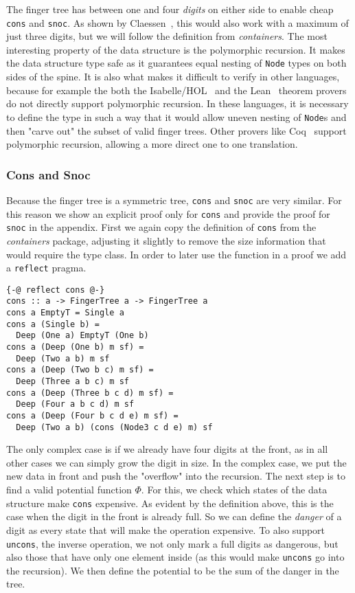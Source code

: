 \documentclass[sigplan,screen]{acmart}
\begin{document}
The finger tree has between one and four \textit{digits} on either side to enable cheap \texttt{cons} and \texttt{snoc}. As shown by Claessen~\cite{fingertrees_new}, this would also work with a maximum of just three digits, but we will follow the definition from \textit{containers}. The most interesting property of the data structure is the polymorphic recursion. It makes the data structure type safe as it guarantees equal nesting of \texttt{Node} types on both sides of the spine. It is also what makes it difficult to verify in other languages, because for example the both the Isabelle/HOL~\cite{isabelle} and the Lean~\cite{lean} theorem provers do not directly support polymorphic recursion. In these languages, it is necessary to define the type in such a way that it would allow uneven nesting of \texttt{Node}s and then "carve out" the subset of valid finger trees. Other provers like Coq~\cite{coq} support polymorphic recursion, allowing a more direct one to one translation.

\subsubsection{Cons and Snoc}

Because the finger tree is a symmetric tree, \texttt{cons} and \texttt{snoc} are very similar. For this reason we show an explicit proof only for \texttt{cons} and provide the proof for \texttt{snoc} in the appendix. First we again copy the definition of \texttt{cons} from the \textit{containers} package, adjusting it slightly to remove the size information that would require the type class. In order to later use the function in a proof we add a \texttt{reflect} pragma.

\begin{lstlisting}
{-@ reflect cons @-}
cons :: a -> FingerTree a -> FingerTree a
cons a EmptyT = Single a
cons a (Single b) =
  Deep (One a) EmptyT (One b)
cons a (Deep (One b) m sf) =
  Deep (Two a b) m sf
cons a (Deep (Two b c) m sf) =
  Deep (Three a b c) m sf
cons a (Deep (Three b c d) m sf) =
  Deep (Four a b c d) m sf
cons a (Deep (Four b c d e) m sf) =
  Deep (Two a b) (cons (Node3 c d e) m) sf
\end{lstlisting}

The only complex case is if we already have four digits at the front, as in all other cases we can simply grow the digit in size. In the complex case, we put the new data in front and push the "overflow" into the recursion. The next step is to find a valid potential function $\Phi$. For this, we check which states of the data structure make \texttt{cons} expensive. As evident by the definition above, this is the case when the digit in the front is already full. So we can define the \textit{danger} of a digit as every state that will make the operation expensive. To also support \texttt{uncons}, the inverse operation, we not only mark a full digits as dangerous, but also those that have only one element inside (as this would make \texttt{uncons} go into the recursion). We then define the potential to be the sum of the danger in the tree.
\end{document}
